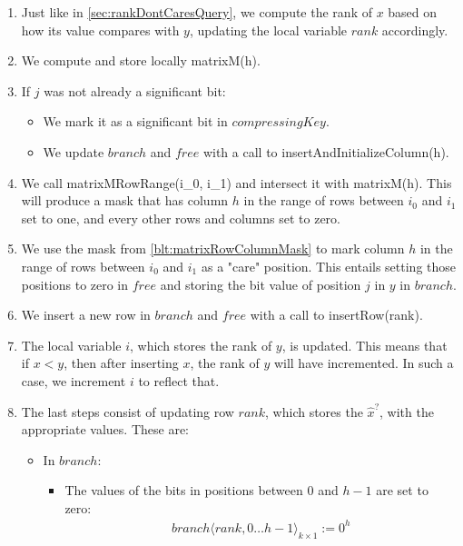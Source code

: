 \begin{enumerate}
\begin{enumerate}
        \item
        Just like in \ref{sec:rankDontCaresQuery}, we compute the rank of $x$ based on how its value compares with $y$, updating the local variable $rank$ accordingly.
        
        \item
        We compute and store locally {\ttfamily matrixM(h)}.
        
        \item
        If $j$ was not already a significant bit:
        \begin{itemize}
            \item
            We mark it as a significant bit in $compressingKey$.
            
            \item
            We update $branch$ and $free$ with a call to {\ttfamily insertAndInitializeColumn(h)}.
        \end{itemize}
        
        \item \label{blt:matrixRowColumnMask}
        We call {\ttfamily matrixMRowRange(i\_0, i\_1)} and intersect it with  {\ttfamily matrixM(h)}. This will produce a mask that has column $h$ in the range of rows between $i_0$ and $i_1$ set to one, and every other rows and columns set to zero.
        
        \item
        We use the mask from \ref{blt:matrixRowColumnMask} to mark column $h$ in the range of rows between $i_0$ and $i_1$ as a "care" position. This entails setting those positions to zero in $free$ and storing the bit value of position $j$ in $y$ in $branch$.
        
        \item
        We insert a new row in $branch$ and $free$ with a call to {\ttfamily insertRow(rank)}.
        
        \item
        The local variable $i$, which stores the rank of $y$, is updated. This means that if $x < y$, then after inserting $x$, the rank of $y$ will have incremented. In such a case, we increment $i$ to reflect that.
        
        \item
        The last steps consist of updating row $rank$, which stores the $\hat x^?$, with the appropriate values. These are:
        \begin{itemize}
            \item
            In $branch$:
            \begin{itemize}
                \item
                The values of the bits in positions between $0$ and $h - 1$ are set to zero:
                \begin{align*}
                    branch\langle rank, 0 \dots h - 1 \rangle_{k \times 1} := 0^h
                \end{align*}
                

\end{itemize}
\end{itemize}
\end{enumerate}
\end{enumerate}
